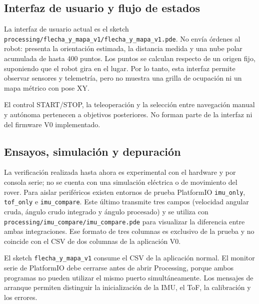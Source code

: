 \subsection{Interfaz de usuario y flujo de estados}

La interfaz de usuario actual es el sketch
\texttt{processing/flecha\_y\_mapa\_v1/flecha\_y\_mapa\_v1.pde}. No envía
órdenes al robot: presenta la orientación estimada, la distancia medida y una
nube polar acumulada de hasta 400 puntos. Los puntos se calculan respecto de un
origen fijo, suponiendo que el robot gira en el lugar. Por lo tanto, esta
interfaz permite observar sensores y telemetría, pero no muestra una grilla de
ocupación ni un mapa métrico con pose XY.

\begin{center}
\end{center}

El control START/STOP, la teleoperación y la selección entre navegación manual
y autónoma pertenecen a objetivos posteriores. No forman parte de la interfaz
ni del firmware V0 implementado.

\subsection{Ensayos, simulación y depuración}

La verificación realizada hasta ahora es experimental con el hardware y por
consola serie; no se cuenta con una simulación eléctrica o de movimiento del
rover. Para aislar periféricos existen entornos de prueba PlatformIO
\texttt{imu\_only}, \texttt{tof\_only} e \texttt{imu\_compare}. Este último
transmite tres campos (velocidad angular cruda, ángulo crudo integrado y ángulo
procesado) y se utiliza con
\texttt{processing/imu\_compare/imu\_compare.pde} para visualizar la diferencia
entre ambas integraciones. Ese formato de tres columnas es exclusivo de la
prueba y no coincide con el CSV de dos columnas de la aplicación V0.

El sketch \texttt{flecha\_y\_mapa\_v1} consume el CSV de la aplicación normal.
El monitor serie de PlatformIO debe cerrarse antes de abrir Processing, porque
ambos programas no pueden utilizar el mismo puerto simultáneamente. Los mensajes
de arranque permiten distinguir la inicialización de la IMU, el ToF, la
calibración y los errores.

